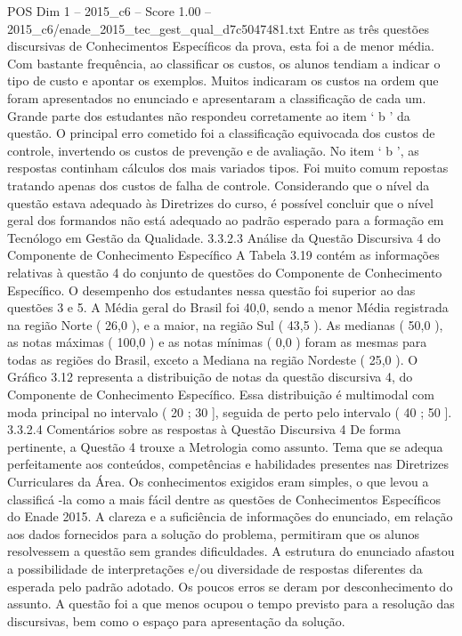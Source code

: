 \begin{textsample}{POS Dim 1 – 2015\_c6 – Score 1.00 – 2015\_c6/enade\_2015\_tec\_gest\_qual\_d7c5047481.txt}
Entre as três questões discursivas de Conhecimentos Específicos da prova, esta foi a de menor média.
Com bastante frequência, ao classificar os custos, os alunos tendiam a indicar o tipo de custo e apontar os exemplos.
Muitos indicaram os custos na ordem que foram apresentados no enunciado e apresentaram a classificação de cada um.
Grande parte dos estudantes não respondeu corretamente ao item ‘ b ’ da questão.
O principal erro cometido foi a classificação equivocada dos custos de controle, invertendo os custos de prevenção e de avaliação.
No item ‘ b ’, as respostas continham cálculos dos mais variados tipos.
Foi muito comum repostas tratando apenas dos custos de falha de controle.
Considerando que o nível da questão estava adequado às Diretrizes do curso, é possível concluir que o nível geral dos formandos não está adequado ao padrão esperado para a formação em Tecnólogo em Gestão da Qualidade. 3.3.2.3 Análise da Questão Discursiva 4 do Componente de Conhecimento Específico A Tabela 3.19 contém as informações relativas à questão 4 do conjunto de questões do Componente de Conhecimento Específico.
O desempenho dos estudantes nessa questão foi superior ao das questões 3 e 5.
A Média geral do Brasil foi 40,0, sendo a menor Média registrada na região Norte ( 26,0 ), e a maior, na região Sul ( 43,5 ).
As medianas ( 50,0 ), as notas máximas ( 100,0 ) e as notas mínimas ( 0,0 ) foram as mesmas para todas as regiões do Brasil, exceto a Mediana na região Nordeste ( 25,0 ).
O Gráfico 3.12 representa a distribuição de notas da questão discursiva 4, do Componente de Conhecimento Específico.
Essa distribuição é multimodal com moda principal no intervalo ( 20 ; 30 ], seguida de perto pelo intervalo ( 40 ; 50 ]. 3.3.2.4 Comentários sobre as respostas à Questão Discursiva 4 De forma pertinente, a Questão 4 trouxe a Metrologia como assunto.
Tema que se adequa perfeitamente aos conteúdos, competências e habilidades presentes nas Diretrizes Curriculares da Área.
Os conhecimentos exigidos eram simples, o que levou a classificá -la como a mais fácil dentre as questões de Conhecimentos Específicos do Enade 2015.
A clareza e a suficiência de informações do enunciado, em relação aos dados fornecidos para a solução do problema, permitiram que os alunos resolvessem a questão sem grandes dificuldades.
A estrutura do enunciado afastou a possibilidade de interpretações e/ou diversidade de respostas diferentes da esperada pelo padrão adotado.
Os poucos erros se deram por desconhecimento do assunto.
A questão foi a que menos ocupou o tempo previsto para a resolução das discursivas, bem como o espaço para apresentação da solução.

\end{textsample}

